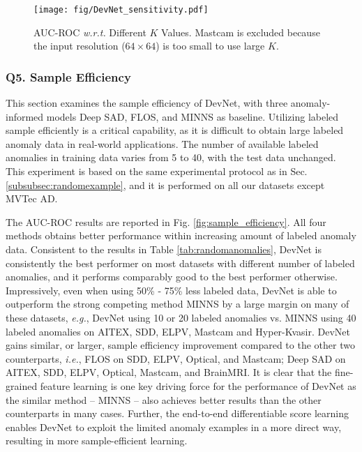 \documentclass[10pt,journal,compsoc]{IEEEtran}
\newcommand{\eg}{\textit{e.g.}}
\newcommand{\ie}{\textit{i.e.}}
\begin{document}
\begin{figure}[h!]
  \centering
    \texttt{[image: fig/DevNet\_sensitivity.pdf]}
  \caption{AUC-ROC \textit{w.r.t.} Different $K$ Values. Mastcam is excluded because the input resolution ($64 \times 64$) is too small to use large $K$.}
  \label{fig:robustness_K}
\end{figure}



\subsubsection{Q5. Sample Efficiency}\label{exp:labeledanomalies}
This section examines the sample efficiency of DevNet, with three anomaly-informed models Deep SAD, FLOS, and MINNS as baseline. Utilizing labeled sample efficiently is a critical capability,  as it is difficult to obtain large labeled anomaly data in real-world applications. The number of available labeled anomalies in training data varies from 5 to 40, with the test data unchanged. This experiment is based on the same experimental protocol as in Sec. \ref{subsubsec:randomexample}, and it is performed on all our datasets except MVTec AD. 

The AUC-ROC results are reported in Fig. \ref{fig:sample_efficiency}. All four methods obtains better performance within increasing amount of labeled anomaly data. Consistent to the results in Table \ref{tab:randomanomalies}, DevNet is consistently the best performer on most datasets with different number of labeled anomalies, and it performs comparably good to the best performer otherwise. Impressively, even when using 50\% - 75\% less labeled data, DevNet is able to outperform the strong competing method MINNS by a large margin on many of these datasets, \eg, DevNet using 10 or 20 labeled anomalies vs. MINNS using 40 labeled anomalies on AITEX, SDD, ELPV, Mastcam and Hyper-Kvasir. DevNet gains similar, or larger, sample efficiency improvement compared to the other two counterparts, \ie, FLOS on SDD, ELPV, Optical, and Mastcam; Deep SAD on AITEX, SDD, ELPV, Optical, Mastcam, and BrainMRI. It is clear that the fine-grained feature learning is one key driving force for the performance of DevNet as the similar method -- MINNS -- also achieves better results than the other counterparts in many cases. Further, the end-to-end differentiable score learning enables DevNet to exploit the limited anomaly examples in a more direct way, resulting in more sample-efficient learning.
\end{document}
